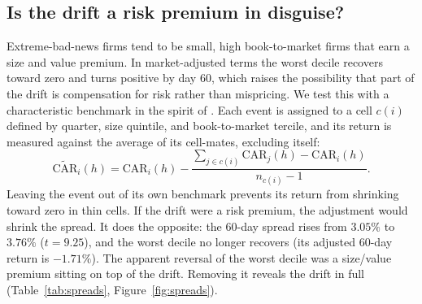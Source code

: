 \documentclass[11pt]{article}
\theoremstyle{definition}
\newcommand{\1}{\mathbf{1}}
\begin{document}
\subsection{Is the drift a risk premium in disguise?}

Extreme-bad-news firms tend to be small, high book-to-market firms that earn a size and value
premium. In market-adjusted terms the worst decile recovers toward zero and turns positive by day 60, which raises the
possibility that part of the drift is compensation for risk rather than mispricing. We test
this with a characteristic benchmark in the spirit of \citet{DGTW1997}. Each event is assigned to
a cell $c(i)$ defined by quarter, size quintile, and book-to-market tercile, and its return
is measured against the average of its cell-mates, excluding itself:
\begin{equation}
  \widetilde{\mathrm{CAR}}_i(h)=\mathrm{CAR}_i(h)-\frac{\sum_{j\in c(i)}\mathrm{CAR}_j(h)-\mathrm{CAR}_i(h)}{n_{c(i)}-1}.
  \label{eq:loo}
\end{equation}
Leaving the event out of its own benchmark prevents its return from shrinking toward zero in
thin cells. If the drift were a risk premium, the adjustment would shrink the spread. It does
the opposite: the 60-day spread rises from $3.05\%$ to $3.76\%$ ($t=9.25$), and the worst decile
no longer recovers (its adjusted 60-day return is $-1.71\%$). The apparent reversal of the worst decile was a size/value premium
sitting on top of the drift. Removing it reveals the drift in full (Table~\ref{tab:spreads},
Figure~\ref{fig:spreads}).
\end{document}
